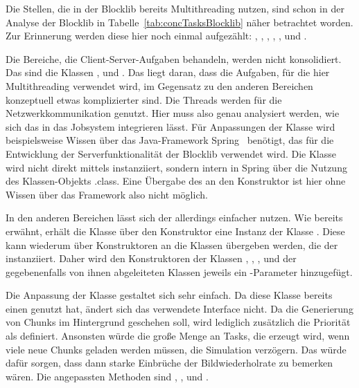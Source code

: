 Die Stellen, die in der Blocklib bereits Multithreading nutzen, sind schon in der Analyse der Blocklib in Tabelle~\ref{tab:concTasksBlocklib} näher betrachtet worden. Zur Erinnerung werden diese hier noch einmal aufgezählt: \classChunkStorage{}, \classEventManager{}, \classConnectionInfo{}, \classNioClientNetworkLayer{}, \classNioServerNetworkLayer{}, \classFluid{} und \classAudioManager{}.

Die Bereiche, die Client-Server-Aufgaben behandeln, werden nicht konsolidiert. Das sind die Klassen \classConnectionInfo{}, \classNioClientNetworkLayer{} und \classNioServerNetworkLayer{}. Das liegt daran, dass die Aufgaben, für die hier Multithreading verwendet wird, im Gegensatz zu den anderen Bereichen konzeptuell etwas komplizierter sind. Die Threads werden für die Netzwerkkommunikation genutzt. Hier muss also genau analysiert werden, wie sich das in das Jobsystem integrieren lässt. Für Anpassungen der Klasse \classConnectionInfo{} wird beispielsweise Wissen über das Java-Framework Spring~\cite{VMware2022} benötigt, das für die Entwicklung der Serverfunktionalität der Blocklib verwendet wird. Die Klasse wird nicht direkt mittels  instanziiert, sondern intern in Spring über die Nutzung des Klassen-Objekts \classConnectionInfo.class{}. Eine Übergabe des \classBlocklibExecutor{} an den Konstruktor ist hier ohne Wissen über das Framework also nicht möglich.

In den anderen Bereichen lässt sich der \classBlocklibExecutorService{} allerdings einfacher nutzen. Wie bereits erwähnt, erhält die Klasse \classContext{} über den Konstruktor eine Instanz der Klasse \classBlocklibExecutor{}. Diese kann wiederum über Konstruktoren an die Klassen übergeben werden, die der \classContext{} instanziiert. Daher wird den Konstruktoren der Klassen \classChunkStorage{}, \classEventManager{}, \classFluidManager{}, \classAudioManager{} und der gegebenenfalls von ihnen abgeleiteten Klassen jeweils ein \classBlocklibExecutorService{}-Parameter hinzugefügt.

Die Anpassung der Klasse \classChunkStorage{} gestaltet sich sehr einfach. Da diese Klasse bereits einen \classExecutor{} genutzt hat, ändert sich das verwendete Interface nicht. Da die Generierung von Chunks im Hintergrund geschehen soll, wird lediglich zusätzlich die Priorität als  definiert. Ansonsten würde die große Menge an Tasks, die erzeugt wird, wenn viele neue Chunks geladen werden müssen, die Simulation verzögern. Das würde dafür sorgen, dass dann starke Einbrüche der Bildwiederholrate zu bemerken wären. Die angepassten Methoden sind	, ,  und .

